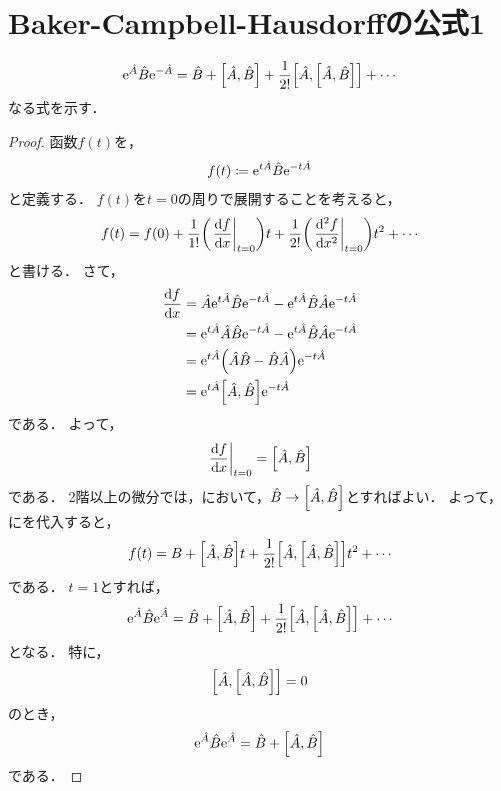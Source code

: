 \documentclass{report}
\begin{document}
  \section{Baker-Campbell-Hausdorffの公式1}
    \begin{align}
      \mathrm{e}^{\hat{A}}\hat{B}\mathrm{e}^{-\hat{A}} = \hat{B} + \qty[\hat{A}, \hat{B}] + \frac{1}{2!}\qty[\hat{A}, \qty[\hat{A}, \hat{B}]] + \cdots
    \end{align}
    なる式を示す．
    \begin{proof}
      函数$f(t)$を，
      \begin{align}
        f(t) \coloneqq \mathrm{e}^{t\hat{A}}\hat{B}\mathrm{e}^{-t\hat{A}}
      \end{align}
      と定義する．
      $f(t)$を$t = 0$の周りで展開することを考えると，
      \begin{align}
        f(t) = f(0) + \frac{1}{1!}\qty(\eval{\dv{f}{x}}_{t = 0})t + \frac{1}{2!}\qty(\eval{\dv[2]{f}{x}}_{t = 0}) t^2 + \cdots \label{taylor-bch}
      \end{align}
      と書ける．
      さて，
      \begin{align}
        \dv{f}{x} &= \hat{A}\mathrm{e}^{t\hat{A}}\hat{B}\mathrm{e}^{-t\hat{A}} - \mathrm{e}^{t\hat{A}}\hat{B}\hat{A}\mathrm{e}^{-t\hat{A}} \\ 
        &= \mathrm{e}^{t\hat{A}}\hat{A}\hat{B}\mathrm{e}^{-t\hat{A}} - \mathrm{e}^{t\hat{A}}\hat{B}\hat{A}\mathrm{e}^{-t\hat{A}} \\ 
        &= \mathrm{e}^{t\hat{A}}\qty(\hat{A}\hat{B} - \hat{B}\hat{A})\mathrm{e}^{-t\hat{A}} \\ 
        &= \mathrm{e}^{t\hat{A}}\qty[\hat{A}, \hat{B}]\mathrm{e}^{-t\hat{A}}\label{1st-diff-bch}
      \end{align}
      である．
      よって，
      \begin{align}
        \eval{\dv{f}{x}}_{t = 0} = \qty[\hat{A}, \hat{B}]
      \end{align}
      である．
      2階以上の微分では，において，$\hat{B} \to \qty[\hat{A}, \hat{B}]$とすればよい．
      よって，にを代入すると，
      \begin{align}
        f(t) = B + \qty[\hat{A}, \hat{B}]t + \frac{1}{2!}\qty[\hat{A}, \qty[\hat{A}, \hat{B}]]t^2 + \cdots
      \end{align}
      である．
      $t = 1$とすれば，
      \begin{align}
        \mathrm{e}^{\hat{A}}\hat{B}\mathrm{e}^{\hat{A}} = \hat{B} + \qty[\hat{A}, \hat{B}] + \frac{1}{2!}\qty[\hat{A}, \qty[\hat{A}, \hat{B}]] + \cdots
      \end{align}
      となる．
      特に，
      \begin{align}
        \qty[\hat{A}, \qty[\hat{A}, \hat{B}]] = 0
      \end{align}
      のとき，
      \begin{align}
        \mathrm{e}^{\hat{A}}\hat{B}\mathrm{e}^{\hat{A}} = \hat{B} + \qty[\hat{A}, \hat{B}]
      \end{align}
      である．
    \end{proof}
\end{document}
